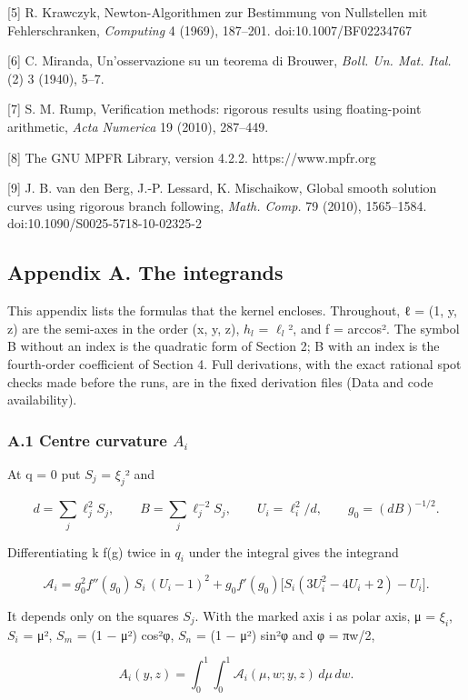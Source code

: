 \documentclass[
  11pt,
]{article}
\begin{document}
{[}5{]} R. Krawczyk, Newton-Algorithmen zur Bestimmung von Nullstellen
mit Fehlerschranken, \emph{Computing} 4 (1969), 187--201.
doi:10.1007/BF02234767

{[}6{]} C. Miranda, Un'osservazione su un teorema di Brouwer,
\emph{Boll. Un. Mat. Ital.} (2) 3 (1940), 5--7.

{[}7{]} S. M. Rump, Verification methods: rigorous results using
floating-point arithmetic, \emph{Acta Numerica} 19 (2010), 287--449.

{[}8{]} The GNU MPFR Library, version 4.2.2. https://www.mpfr.org

{[}9{]} J. B. van den Berg, J.-P. Lessard, K. Mischaikow, Global smooth
solution curves using rigorous branch following, \emph{Math. Comp.} 79
(2010), 1565--1584. doi:10.1090/S0025-5718-10-02325-2

\subsection{Appendix A. The integrands}

This appendix lists the formulas that the kernel encloses. Throughout, ℓ
= (1, y, z) are the semi-axes in the order (x, y, z), \(h_{l}\) =
\(\ell_{l}\)², and f = arccos². The symbol B without an index is the
quadratic form of Section 2; B with an index is the fourth-order
coefficient of Section 4. Full derivations, with the exact rational spot
checks made before the runs, are in the fixed derivation files (Data and
code availability).

\subsubsection{\texorpdfstring{A.1 Centre curvature
\(A_{i}\)}{A.1 Centre curvature A\_\{i\}}}

At q = 0 put \(S_{j}\) = \(\xi_{j}\)² and

\[
d=\sum_j \ell_j^2 S_j,\qquad B=\sum_j \ell_j^{-2}S_j,\qquad U_i=\ell_i^2/d,\qquad g_0=(dB)^{-1/2}.
\]

Differentiating k f(g) twice in \(q_{i}\) under the integral gives the
integrand

\[
\mathcal A_i=g_0^2 f''(g_0)\,S_i\,(U_i-1)^2+g_0 f'(g_0)\bigl[S_i(3U_i^2-4U_i+2)-U_i\bigr].
\]

It depends only on the squares \(S_{j}\). With the marked axis i as
polar axis, μ = \(\xi_{i}\), \(S_{i}\) = μ², \(S_{m}\) = (1 − μ²) cos²φ,
\(S_{n}\) = (1 − μ²) sin²φ and φ = πw/2,

\[
A_i(y,z)=\int_0^1\!\!\int_0^1 \mathcal A_i(\mu,w;y,z)\,d\mu\,dw .
\]
\end{document}
